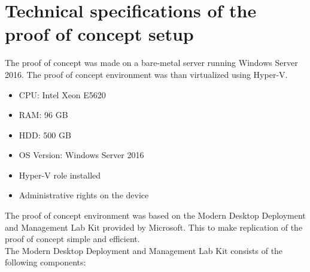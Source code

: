 \section{Technical specifications of the proof of concept setup}
The proof of concept was made on a bare-metal server running Windows Server 2016. The proof of concept environment was than virtualized using Hyper-V. 
\begin{itemize}
	\item CPU: Intel Xeon E5620
	\item RAM: 96 GB 
	\item HDD: 500 GB
	\item OS Version: Windows Server 2016
	\item Hyper-V role installed
	\item Administrative rights on the device
\end{itemize}
The proof of concept environment was based on the Modern Desktop Deployment and Management Lab Kit provided by Microsoft. \autocite{Gallagher2018}
This to make replication of the proof of concept simple and efficient.
\\
The Modern Desktop Deployment and Management Lab Kit consists of the following components:
\\

